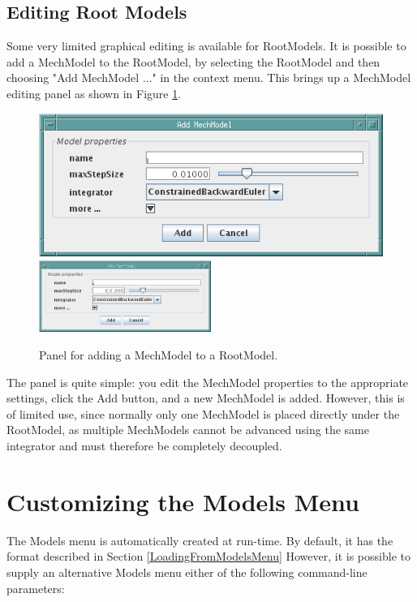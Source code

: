 \documentclass{article}
\begin{document}
\subsection{Editing Root Models}

Some very limited graphical editing is available for RootModels.  It
is possible to add a MechModel to the RootModel, by selecting the
RootModel and then choosing {\sf "Add MechModel ..."} in the context
menu. This brings up a MechModel editing panel as shown in
Figure \ref{addMechModelPanelFig}.

\begin{figure}
\begin{center}
\iflatexml
\includegraphics[]{images/addMechModelPanel}
\else
\includegraphics[width=0.50\textwidth]{images/addMechModelPanel}
\fi
\end{center}
\caption{Panel for adding a MechModel to a RootModel.}%
\label{addMechModelPanelFig}
\end{figure}

The panel is quite simple: you edit the MechModel properties to the
appropriate settings, click the {\sf Add} button, and a new MechModel is
added. However, this is of limited use, since normally only one
MechModel is placed directly under the RootModel, as multiple
MechModels cannot be advanced using the same integrator and must
therefore be completely decoupled.

\section{Customizing the Models Menu}
\label{CustomizingModelsMenu}

The \textsf{Models} menu is automatically created at run-time.  By
default, it has the format described in Section \ref{LoadingFromModelsMenu}
However, it is possible to supply an alternative {\sf Models} menu
either of the following command-line parameters:
\end{document}
